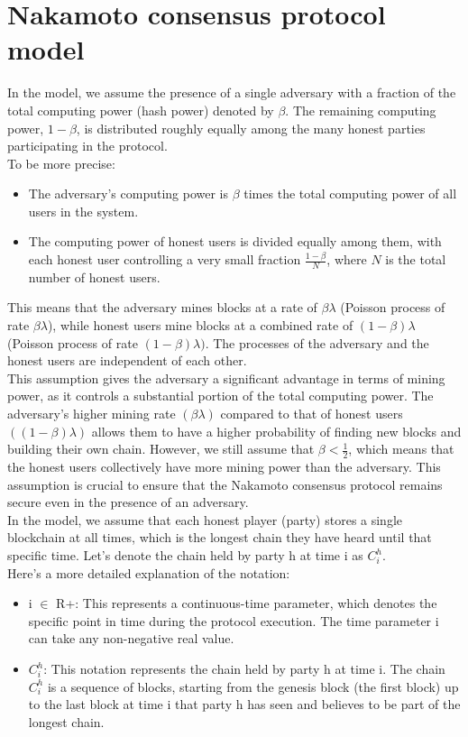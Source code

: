 \section{Nakamoto consensus protocol model}
In the model, we assume the presence of a single adversary with a fraction of the total computing power (hash power) denoted by $\beta$. The remaining computing power, $1 - \beta$, is distributed roughly equally among the many honest parties participating in the protocol.\\
To be more precise:
\begin{itemize}
    \item The adversary's computing power is $\beta$ times the total computing power of all users in the system.
    \item The computing power of honest users is divided equally among them, with each honest user controlling a very small fraction $\frac{1 - \beta}{N}$, where $N$ is the total number of honest users. 
\end{itemize}
This means that the adversary mines blocks at a rate of $\beta \lambda$ (Poisson process of rate $\beta \lambda$), while honest users mine blocks at a combined rate of $(1 - \beta)\lambda$ (Poisson process of rate $(1 - \beta)\lambda)$. The processes of the adversary and the honest users are independent of each other.\\
This assumption gives the adversary a significant advantage in terms of mining power, as it controls a substantial portion of the total computing power. The adversary's higher mining rate $(\beta\lambda)$ compared to that of honest users $((1 - \beta)\lambda)$ allows them to have a higher probability of finding new blocks and building their own chain. However, we still assume that $\beta < \frac{1}{2}$, which means that the honest users collectively have more mining power than the adversary. This assumption is crucial to ensure that the Nakamoto consensus protocol remains secure even in the presence of an adversary.\\
In the model, we assume that each honest player (party) stores a single blockchain at all times, which is the longest chain they have heard until that specific time. Let's denote the chain held by party h at time i as $C_{i}^{h}$.\\
Here's a more detailed explanation of the notation:\\
\begin{itemize}
    \item i $\in$ R+: This represents a continuous-time parameter, which denotes the specific point in time during the protocol execution. The time parameter i can take any non-negative real value.
    \item $C_{i}^{h}$: This notation represents the chain held by party h at time i. The chain $C_{i}^{h}$ is a sequence of blocks, starting from the genesis block (the first block) up to the last block at time i that party h has seen and believes to be part of the longest chain.
\end{itemize}
